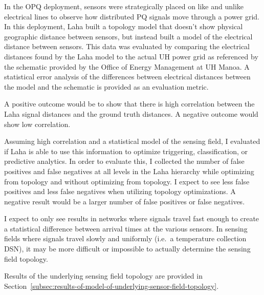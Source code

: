 In the OPQ deployment, sensors were strategically placed on like and unlike electrical lines to observe how distributed PQ signals move through a power grid. In this deployment, Laha built a topology model that doesn't show physical geographic distance between sensors, but instead built a model of the electrical distance between sensors. This data was evaluated by comparing the electrical distances found by the Laha model to the actual UH power grid as referenced by the schematic provided by the Office of Energy Management at UH Manoa. A statistical error analysis of the differences between electrical distances between the model and the schematic is provided as an evaluation metric.

A positive outcome would be to show that there is high correlation between the Laha signal distances and the ground truth distances. A negative outcome would show low correlation.

Assuming high correlation and a statistical model of the sensing field, I evaluated if Laha is able to use this information to optimize triggering, classification, or predictive analytics. In order to evaluate this, I collected the number of false positives and false negatives at all levels in the Laha hierarchy while optimizing from topology and without optimizing from topology. I expect to see less false positives and less false negatives when utilizing topology optimizations. A negative result would be a larger number of false positives or false negatives.

I expect to only see results in networks where signals travel fast enough to create a statistical difference between arrival times at the various sensors. In sensing fields where signals travel slowly and uniformly (i.e.\ a temperature collection DSN), it may be more difficult or impossible to actually determine the sensing field topology.

Results of the underlying sensing field topology are provided in Section~\ref{subsec:results-of-model-of-underlying-sensor-field-topology}.
